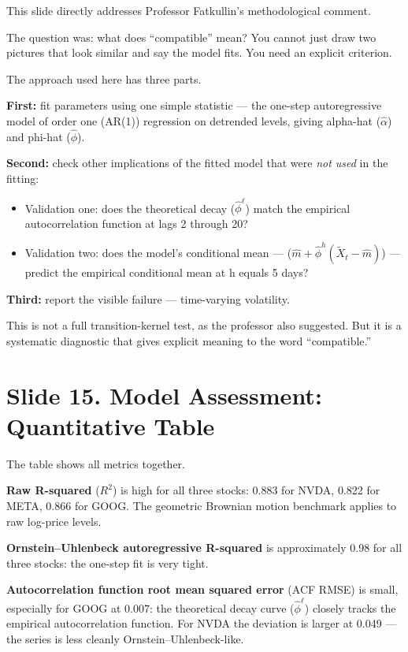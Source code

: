\documentclass[12pt,a4paper]{article}
\begin{document}
This slide directly addresses Professor Fatkullin's methodological comment.

The question was: what does ``compatible'' mean?
You cannot just draw two pictures that look similar and say the model fits.
You need an explicit criterion.

The approach used here has three parts.

\textbf{First:} fit parameters using one simple statistic ---
the one-step autoregressive model of order one (AR(1)) regression on detrended levels,
giving alpha-hat ($\hat\alpha$) and phi-hat ($\hat\phi$).

\textbf{Second:} check other implications of the fitted model
that were \emph{not used} in the fitting:
\begin{itemize}
  \item Validation one: does the theoretical decay ($\hat\phi^\ell$)
        match the empirical autocorrelation function at lags 2 through 20?
  \item Validation two: does the model's conditional mean ---
        ($\hat m + \hat\phi^h(\widetilde{X}_t - \hat m)$) ---
        predict the empirical conditional mean at h equals 5 days?
\end{itemize}

\textbf{Third:} report the visible failure ---
time-varying volatility.

This is not a full transition-kernel test, as the professor also suggested.
But it is a systematic diagnostic that gives explicit meaning
to the word ``compatible.''

\section{Slide 15. Model Assessment: Quantitative Table}

The table shows all metrics together.

\textbf{Raw R-squared} ($R^2$) is high for all three stocks:
0.883 for NVDA, 0.822 for META, 0.866 for GOOG.
The geometric Brownian motion benchmark applies to raw log-price levels.

\textbf{Ornstein--Uhlenbeck autoregressive R-squared} is approximately 0.98
for all three stocks: the one-step fit is very tight.

\textbf{Autocorrelation function root mean squared error} (ACF RMSE)
is small, especially for GOOG at 0.007:
the theoretical decay curve ($\hat\phi^\ell$) closely tracks
the empirical autocorrelation function.
For NVDA the deviation is larger at 0.049 ---
the series is less cleanly Ornstein--Uhlenbeck-like.
\end{document}
